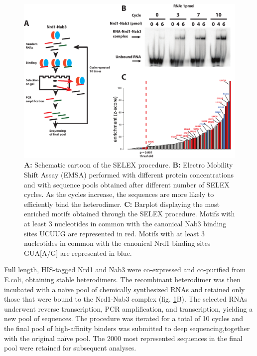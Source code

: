 \begin{figure}[h]

\centering
\includegraphics[width=\textwidth]{figures/results/selex}
\caption[SELEX procedure]{\textbf{A: }Schematic cartoon of the SELEX procedure. \textbf{B: }Electro Mobility Shift Assay (EMSA) performed with different protein concentrations and with sequence pools obtained after different number of SELEX cycles. As the cycles increase, the sequences are more likely to efficiently bind the heterodimer. \textbf{C: } Barplot displaying the most enriched motifs obtained through the SELEX procedure. Motifs with at least 3 nucleotides in common with the canonical Nab3 binding sites UCUUG are represented in red. Motifs with at least 3 nucleotides in common with the canonical Nrd1 binding sites GUA[A/G] are represented in blue.}
\label{fig:selex}

\end{figure} 

Full length, HIS-tagged Nrd1 and Nab3 were co-expressed and co-purified from E.coli, obtaining stable heterodimers. The recombinant heterodimer was then incubated with a naïve pool of chemically synthesized RNAs and retained only those that were bound to the Nrd1-Nab3 complex (fig. \ref{fig:selex}B). 
The selected RNAs underwent reverse transcription, PCR amplification, and \invitro{} transcription, yielding a new pool of sequences. The procedure was iterated for a total of 10 cycles and the final pool of high-affinity binders was submitted to deep sequencing,together with the original naïve pool. The 2000 most represented sequences in the final pool were retained for subsequent analyses. 



